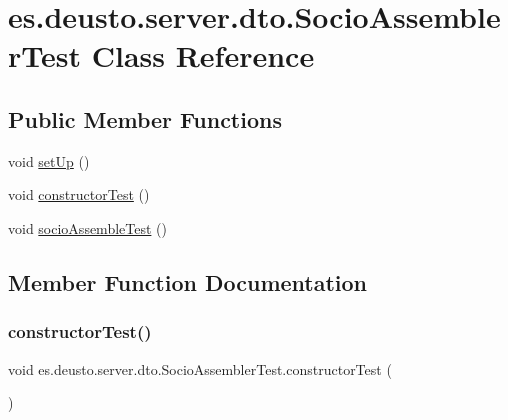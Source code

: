 \hypertarget{classes_1_1deusto_1_1server_1_1dto_1_1_socio_assembler_test}{}\section{es.\+deusto.\+server.\+dto.\+Socio\+Assembler\+Test Class Reference}
\label{classes_1_1deusto_1_1server_1_1dto_1_1_socio_assembler_test}
\subsection*{Public Member Functions}
\begin{DoxyCompactItemize}
\item 
void \mbox{\hyperlink{classes_1_1deusto_1_1server_1_1dto_1_1_socio_assembler_test_ac9d38a1a69b925703f995161f5a9fb36}{set\+Up}} ()
\item 
void \mbox{\hyperlink{classes_1_1deusto_1_1server_1_1dto_1_1_socio_assembler_test_a48b0d632f32dbd11f35c654737ff7b97}{constructor\+Test}} ()
\item 
void \mbox{\hyperlink{classes_1_1deusto_1_1server_1_1dto_1_1_socio_assembler_test_a924609207b24e0c6ca0e681d1d052257}{socio\+Assemble\+Test}} ()
\end{DoxyCompactItemize}


\subsection{Member Function Documentation}
\mbox{\label{classes_1_1deusto_1_1server_1_1dto_1_1_socio_assembler_test_a48b0d632f32dbd11f35c654737ff7b97}} 
\subsubsection{\texorpdfstring{constructorTest()}{constructorTest()}}
{\footnotesize\ttfamily void es.\+deusto.\+server.\+dto.\+Socio\+Assembler\+Test.\+constructor\+Test (\begin{DoxyParamCaption}{ }\end{DoxyParamCaption})}

\mbox{\label{classes_1_1deusto_1_1server_1_1dto_1_1_socio_assembler_test_ac9d38a1a69b925703f995161f5a9fb36}} 
